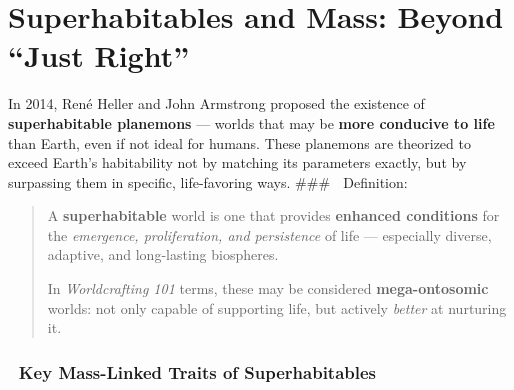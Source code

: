 \documentclass[
  letterpaper,
]{book}
\begin{document}
\section{Superhabitables and Mass: Beyond ``Just
Right''}\label{superhabitables-and-mass-beyond-just-right}

In 2014, René Heller and John Armstrong proposed the existence of
\textbf{superhabitable planemons} --- worlds that may be \textbf{more
conducive to life} than Earth, even if not ideal for humans. These
planemons are theorized to exceed Earth's habitability not by matching
its parameters exactly, but by surpassing them in specific,
life-favoring ways. \#\#\# 📌 Definition:

\begin{quote}
A \textbf{superhabitable} world is one that provides \textbf{enhanced
conditions} for the \emph{emergence, proliferation, and persistence} of
life --- especially diverse, adaptive, and long-lasting biospheres.

In \emph{Worldcrafting 101} terms, these may be considered
\textbf{mega-ontosomic} worlds: not only capable of supporting life, but
actively \emph{better} at nurturing it.
\end{quote}

\subsubsection{🔸 Key Mass-Linked Traits of
Superhabitables}\label{key-mass-linked-traits-of-superhabitables}
\end{document}
